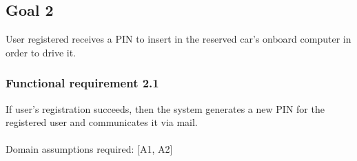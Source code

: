 \subsection{Goal 2}
User registered receives a PIN to insert in the reserved car's onboard computer in order to drive it.

\setcounter{secnumdepth}{3}
\subsubsection{Functional requirement 2.1}
If user's registration succeeds, then the system generates a new PIN for the registered user and communicates it via mail.\\~\\
\noindent Domain assumptions required: [A1, A2]